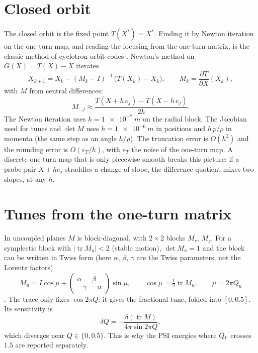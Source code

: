 \section{Closed orbit}
The closed orbit is the fixed point $T(X^*) = X^*$.
Finding it by Newton iteration on the one-turn map, and reading the focusing from the one-turn matrix, is the classic
method of cyclotron orbit codes \cite{gordon1984}.
Newton's method on $G(X) = T(X) - X$ iterates
\begin{equation}
X_{k+1} = X_k - (M_k - I)^{-1}\,\big(T(X_k)-X_k\big),\qquad M_k = \frac{\partial T}{\partial X}(X_k),
\end{equation}
with $M$ from central differences:
\begin{equation}
M_{:,j} \approx \frac{T(X+h\,e_j) - T(X-h\,e_j)}{2h}.
\end{equation}
The Newton iteration uses $h = \SI{1e-7}{m}$ on the radial block.
The Jacobian used for tunes and $\det M$ uses $h = \SI{1e-6}{m}$ in positions and $h\,p/\rho$ in momenta (the same step
as an angle $h/\rho$).
The truncation error is $O(h^2)$ and the rounding error is $O(\varepsilon_T/h)$, with $\varepsilon_T$ the noise of the
one-turn map.
A discrete one-turn map that is only piecewise smooth breaks this picture: if a probe pair $X\pm he_j$ straddles a change of
slope, the difference quotient mixes two slopes, at any $h$.

\section{Tunes from the one-turn matrix}
In uncoupled planes $M$ is block-diagonal, with $2\times2$ blocks $M_r$, $M_z$.
For a symplectic block with $|\operatorname{tr}M_u|<2$ (stable motion), $\det M_u = 1$ and the block can be written in
Twiss form (here $\alpha$, $\beta$, $\gamma$ are the Twiss parameters, not the Lorentz factors)
\begin{equation}
M_u = I\cos\mu + \begin{pmatrix}\alpha & \beta\\ -\gamma & -\alpha\end{pmatrix}\sin\mu,\qquad
\cos\mu = \tfrac12\operatorname{tr}M_u,\qquad \mu = 2\pi Q_u
\end{equation}
\cite{courant1958}.
The trace only fixes $\cos 2\pi Q$: it gives the fractional tune, folded into $[0, 0.5]$.
Its sensitivity is
\begin{equation}
\delta Q = -\frac{\delta(\operatorname{tr}M)}{4\pi\sin 2\pi Q},
\end{equation}
which diverges near $Q\in\{0, 0.5\}$.
This is why the PSI energies where $Q_r$ crosses $1.5$ are reported separately.

